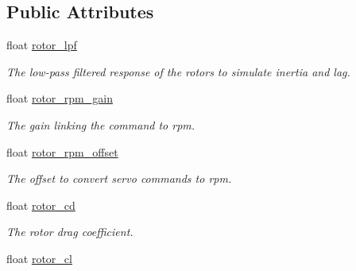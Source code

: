 \subsection*{Public Attributes}
\begin{DoxyCompactItemize}
\item 
\hypertarget{structsimulation__config__t_aba47dad91ec77ce427c54a73c106771e}{float \hyperlink{structsimulation__config__t_aba47dad91ec77ce427c54a73c106771e}{rotor\+\_\+lpf}}\label{structsimulation__config__t_aba47dad91ec77ce427c54a73c106771e}

\begin{DoxyCompactList}\small\item\em The low-\/pass filtered response of the rotors to simulate inertia and lag. \end{DoxyCompactList}\item 
\hypertarget{structsimulation__config__t_ac71918adff9123575aad0830dd419bc3}{float \hyperlink{structsimulation__config__t_ac71918adff9123575aad0830dd419bc3}{rotor\+\_\+rpm\+\_\+gain}}\label{structsimulation__config__t_ac71918adff9123575aad0830dd419bc3}

\begin{DoxyCompactList}\small\item\em The gain linking the command to rpm. \end{DoxyCompactList}\item 
\hypertarget{structsimulation__config__t_a615309f20c97fd40409f53cf34c944ba}{float \hyperlink{structsimulation__config__t_a615309f20c97fd40409f53cf34c944ba}{rotor\+\_\+rpm\+\_\+offset}}\label{structsimulation__config__t_a615309f20c97fd40409f53cf34c944ba}

\begin{DoxyCompactList}\small\item\em The offset to convert servo commands to rpm. \end{DoxyCompactList}\item 
\hypertarget{structsimulation__config__t_ac5ba4966b140c6863e049372d65fc3bd}{float \hyperlink{structsimulation__config__t_ac5ba4966b140c6863e049372d65fc3bd}{rotor\+\_\+cd}}\label{structsimulation__config__t_ac5ba4966b140c6863e049372d65fc3bd}

\begin{DoxyCompactList}\small\item\em The rotor drag coefficient. \end{DoxyCompactList}\item 
\hypertarget{structsimulation__config__t_a4b38a7abb11ae49d4f5f9a85354aada9}{float \hyperlink{structsimulation__config__t_a4b38a7abb11ae49d4f5f9a85354aada9}{rotor\+\_\+cl}}\label{structsimulation__config__t_a4b38a7abb11ae49d4f5f9a85354aada9}


\end{DoxyCompactItemize}
